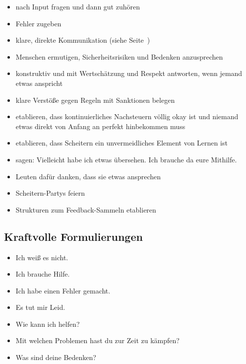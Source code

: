 \begin{itemize}
  \item nach Input fragen und dann gut zuhören  
  \item Fehler zugeben 
  \item klare, direkte Kommunikation (siehe Seite~\pageref{direkte-kommunikation}) 
  \item Menschen ermutigen, Sicherheitsrisiken und Bedenken anzusprechen
  \item konstruktiv und mit Wertschätzung und Respekt antworten, wenn jemand etwas anspricht  
  \item klare Verstöße gegen Regeln mit Sanktionen belegen  
  \item etablieren, dass kontinuierliches Nachsteuern völlig okay ist und niemand etwas direkt von Anfang an perfekt hinbekommen muss  
  \item etablieren, dass Scheitern ein unvermeidliches Element von Lernen ist 
  \item sagen: \glqq Vielleicht habe ich etwas übersehen. Ich brauche da eure Mithilfe.\grqq {}
  \item Leuten dafür danken, dass sie etwas ansprechen 
  \item Scheitern-Partys feiern 
  \item Strukturen zum Feedback-Sammeln etablieren 
\end{itemize}


\subsection{Kraftvolle Formulierungen}

\begin{itemize}
  \item \glqq Ich weiß es nicht.\grqq
  \item \glqq Ich brauche Hilfe.\grqq
  \item \glqq Ich habe einen Fehler gemacht.\grqq
  \item \glqq Es tut mir Leid.\grqq
  \item \glqq Wie kann ich helfen?\grqq
  \item \glqq Mit welchen Problemen hast du zur Zeit zu kämpfen?\grqq
  \item \glqq Was sind deine Bedenken?\grqq
\end{itemize}
